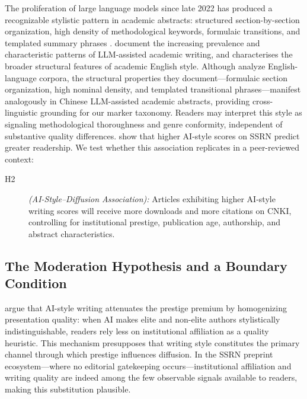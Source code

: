 \documentclass[12pt,a4paper]{article}
\begin{document}
The proliferation of large language models since late 2022 has produced
a recognizable stylistic pattern in academic abstracts: structured
section-by-section organization, high density of methodological keywords,
formulaic transitions, and templated summary phrases
\citep{Liang2024,Biber2016}.
\citet{Liang2024} document the increasing prevalence and characteristic
patterns of LLM-assisted academic writing, and \citet{Biber2016}
characterises the broader structural features of academic English style.
Although \citeauthor{Biber2016} analyze English-language corpora, the
structural properties they document---formulaic section organization,
high nominal density, and templated transitional phrases---manifest
analogously in Chinese LLM-assisted academic abstracts, providing
cross-linguistic grounding for our marker taxonomy.
Readers may interpret this style as signaling methodological
thoroughness and genre conformity, independent of substantive quality
differences.
\citet{JoLi2026} show that higher AI-style scores on SSRN predict
greater readership.
We test whether this association replicates in a peer-reviewed context:
\begin{description}
  \item[H2] \textit{(AI-Style--Diffusion Association):}
  Articles exhibiting higher AI-style writing scores will receive
  more downloads and more citations on CNKI, controlling for
  institutional prestige, publication age, authorship, and abstract
  characteristics.
\end{description}

\subsection{The Moderation Hypothesis and a Boundary Condition}

\citet{JoLi2026} argue that AI-style writing attenuates the prestige
premium by homogenizing presentation quality: when AI makes elite and
non-elite authors stylistically indistinguishable, readers rely less
on institutional affiliation as a quality heuristic.
This mechanism presupposes that writing style constitutes the primary
channel through which prestige influences diffusion.
In the SSRN preprint ecosystem---where no editorial gatekeeping
occurs---institutional affiliation and writing quality are indeed
among the few observable signals available to readers, making this
substitution plausible.
\end{document}
